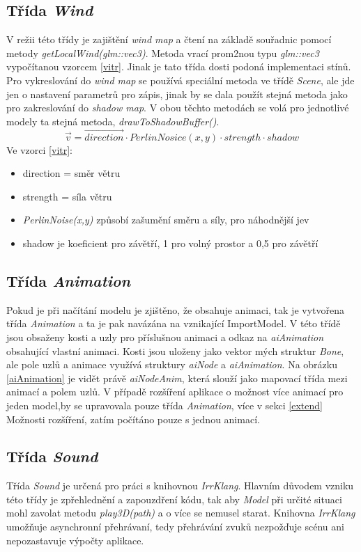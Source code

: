 \subsection{Třída \emph{Wind}}
V režii této třídy je zajištění \emph{wind map} a čtení na základě souřadnic pomocí metody \emph{getLocalWind(glm::vec3)}. Metoda vrací prom2nou typu \emph{glm::vec3} vypočítanou vzorcem \ref{vitr}. Jinak je tato třída dosti podoná implementaci stínů. Pro vykreslování do \emph{wind map} se používá speciální metoda ve třídě \emph{Scene}, ale jde jen o nastavení parametrů pro zápis, jinak by se dala použít stejná metoda jako pro zakreslování do \emph{shadow map}. V obou těchto metodách se volá pro jednotlivé modely ta stejná metoda, \emph{drawToShadowBuffer()}. 
\begin{equation}\label{vitr}
\vec{v} = \overrightarrow{direction} \cdot PerlinNosice(x,y) \cdot strength \cdot shadow
\end{equation}
Ve vzorci \ref{vitr}:
\begin{itemize}
	\item direction = směr větru
	\item strength = síla větru
	\item \emph{PerlinNoise(x,y)} způsobí zašumění směru a síly, pro náhodnější jev
	\item shadow je koeficient pro závětří, 1 pro volný prostor a 0,5 pro závětří
\end{itemize}
\subsection{Třída \emph{Animation}}
Pokud je při načítání modelu je zjištěno, že obsahuje animaci, tak je vytvořena třída \emph{Animation} a ta je pak navázána na vznikající ImportModel. V této třídě jsou obsaženy kosti a uzly pro příslušnou animaci a odkaz na \emph{aiAnimation} obsahující vlastní animaci. Kosti jsou uloženy jako vektor mých struktur \emph{Bone}, ale pole uzlů a animace využívá struktury \emph{aiNode} a \emph{aiAnimation}. Na obrázku \ref{aiAnimation} je vidět právě \emph{aiNodeAnim}, která slouží jako mapovací třída mezi animací a polem uzlů. V případě rozšíření aplikace o možnost více animací pro jeden model,by se upravovala pouze třída \emph{Animation}, více v sekci  \ref{extend} Možnosti rozšíření, zatím počítáno pouze s jednou animací. 
\subsection{Třída \emph{Sound}}
Třída \emph{Sound} je určená pro práci s knihovnou \emph{IrrKlang}\cite{irrKlang}. Hlavním důvodem vzniku této třídy je zpřehlednění a zapouzdření kódu, tak aby \emph{Model} při určité situaci mohl zavolat metodu \emph{play3D(path)} a o více se nemusel starat. Knihovna \emph{IrrKlang} umožňuje asynchronní přehrávaní, tedy přehrávání zvuků nezpožďuje scénu ani nepozastavuje výpočty aplikace.

